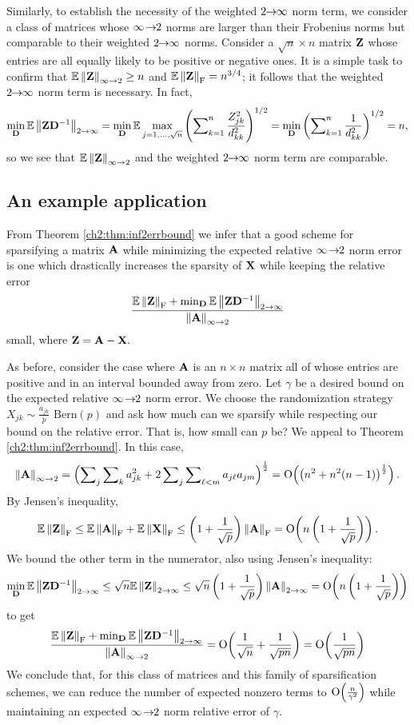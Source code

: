 Similarly, to establish the necessity of the weighted $2\!\!\rightarrow\!\!\infty$ norm term, we
consider a class of matrices whose $\infty\!\rightarrow\!\!2$ norms are larger than their
Frobenius norms but comparable to their weighted $2\!\!\rightarrow\!\!\infty$ norms. Consider a
$\sqrt{n}\times n$ matrix $\mathbf{Z}$ whose entries are all equally likely to be
positive or negative ones. It is a simple task to confirm that
$\mathbb{E}\left\|\mathbf{Z}\right\|_{\infty\rightarrow 2}\geq n$ and $\mathbb{E}\left\|\mathbf{Z}\right\|_{\mathrm{F}}=n^{3/4}$; it follows that
the weighted $2\!\!\rightarrow\!\!\infty$ norm term is necessary. In fact, 
\[
\min_{\mathbf{D}}\mathbb{E}\left\|\mathbf{Z}\mathbf{D}^{-1}\right\|_{2 \rightarrow \infty}=\min_{\mathbf{D}}\mathbb{E}\max_{j=1,
\ldots,\sqrt{n}}\left(\sum\nolimits_{k=1}^{n}\frac{Z_{jk}^{2}}{d_{kk}^{2}}
\right)^{1/2}=\min_{\mathbf{D}}\left(\sum\nolimits_{k=1}^{n}\frac{1}{d_{kk}^{2}}
\right)^{1/2}=n,
\]
so we see that $\mathbb{E}\left\|\mathbf{Z}\right\|_{\infty\rightarrow 2}$ and the weighted $2\!\!\rightarrow\!\!\infty$ norm term are
comparable.

\subsection{An example application}

From Theorem \ref{ch2:thm:inf2errbound} we infer that a good scheme for sparsifying
a matrix $\mathbf{A}$ while minimizing the expected relative $\infty\!\rightarrow\!\!2$ norm error
is one which drastically increases the sparsity of $\mathbf{X}$ while keeping the
relative error  
\[
\frac{\mathbb{E}\left\|\mathbf{Z}\right\|_{\mathrm{F}}+\min_{\mathbf{D}}\mathbb{E}\left\|\mathbf{Z}\mathbf{D}^{-1}\right\|_{2 \rightarrow \infty}}{
\left\|\mathbf{A}\right\|_{\infty\rightarrow 2}}
\]
small, where $\mathbf{Z} = \mathbf{A} - \mathbf{X}.$

As before, consider the case where $\mathbf{A}$ is an $n\times n$ matrix all of
whose entries are positive and in an interval bounded away from zero. Let
$\gamma$ be a desired bound on the expected relative $\infty\!\rightarrow\!\!2$ norm error. We
choose the randomization strategy $X_{jk}\sim\frac{a_{jk}}{p}\text{ Bern}(p)$
and ask how much can we sparsify while respecting our bound on the relative
error. That is, how small can $p$ be? We appeal to Theorem
\ref{ch2:thm:inf2errbound}. In this case, 
\[
\left\|\mathbf{A}\right\|_{\infty\rightarrow 2}=\left(\sum\nolimits_{j}\sum\nolimits_{k}a_{jk}^{2}
+2\sum\nolimits_{j}\sum\nolimits_{\ell<m}a_{j\ell}a_{jm}\right)^{\frac{1}{2}}
=\mathop{\text{O}}\!\left(\left(n^{2}+n^{2}(n-1)\right)^{\frac{1}{2}}\right).
\]
By Jensen's inequality, 
\[
\mathbb{E}\left\|\mathbf{Z}\right\|_{\mathrm{F}} \leq \mathbb{E}\left\|\mathbf{A}\right\|_{\mathrm{F}} + \mathbb{E}\left\|\mathbf{X}\right\|_{\mathrm{F}}\leq \left(1 +
\frac{1}{\sqrt{p}}\right)\left\|\mathbf{A}\right\|_{\mathrm{F}} = \mathop{\text{O}}\!\left(n \left(1 +
\frac{1}{\sqrt{p}}\right)\right).
\]
We bound the other term in the numerator, also using Jensen's inequality: 
\[
\min_{\mathbf{D}} \mathbb{E}\left\|\mathbf{Z}\mathbf{D}^{-1}\right\|_{2 \rightarrow \infty} \leq
\sqrt{n}\mathbb{E}\left\|\mathbf{Z}\right\|_{2 \rightarrow \infty} \leq \sqrt{n}\left(1 +
\frac{1}{\sqrt{p}}\right)\left\|\mathbf{A}\right\|_{2 \rightarrow \infty} = \mathop{\text{O}}\!\left(n \left(1 +
\frac{1}{\sqrt{p}}\right) \right) 
\]
to get 
\[
\frac{\mathbb{E}\left\|\mathbf{Z}\right\|_{\mathrm{F}} + \min_{\mathbf{D}} \mathbb{E}\left\|\mathbf{Z}\mathbf{D}^{-1}\right\|_{2 \rightarrow \infty}
}{\left\|\mathbf{A}\right\|_{\infty\rightarrow 2}} = \mathop{\text{O}}\!\left(\frac{1}{\sqrt{n}} + \frac{1}{\sqrt{pn}}\right) =
\mathop{\text{O}}\!\left(\frac{1}{\sqrt{pn}}\right)
\]
We conclude that, for this class of matrices and this family of sparsification
schemes, we can reduce the number of expected nonzero terms to
$\mathop{\text{O}}\!\left(\frac{n}{\gamma^{2}}\right)$ while maintaining an expected $\infty\!\rightarrow\!\!2$ norm
relative error of $\gamma$.


